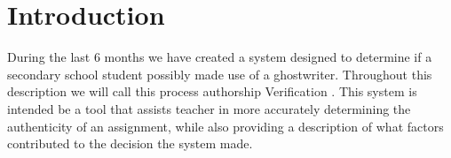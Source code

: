 \documentclass[11pt]{article}
\begin{document}
    \clearpage\maketitle
    \thispagestyle{empty}
    \newpage

    \setcounter{page}{1}

    \section{Introduction}

    During the last 6 months we have created a system designed to determine if a
    secondary school student possibly made use of a ghostwriter. Throughout this
    description we will call this process authorship Verification . This system
    is intended be a tool that assists teacher in more accurately determining
    the authenticity of an assignment, while also providing a description of
    what factors contributed to the decision the system made.
\end{document}
